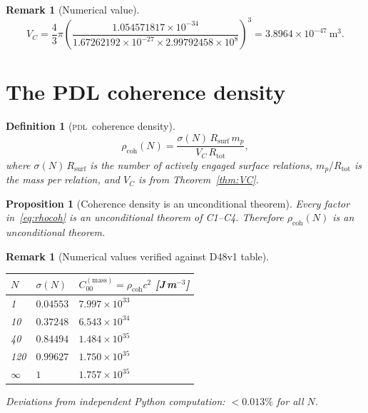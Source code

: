 \documentclass[12pt,a4paper]{article}
\newtheorem{proposition}[theorem]{Proposition}
\newtheorem{definition}[theorem]{Definition}
\newtheorem{remark}[theorem]{Remark}
\newcommand{\PDL}{\textsc{pdl}}
\newcommand{\Cmass}{C^{(\mathrm{mass})}}
\newcommand{\rhocoh}{\rho_{\mathrm{coh}}}
\newcommand{\sig}{\sigma}
\newcommand{\Rsurf}{R_{\mathrm{surf}}}
\newcommand{\Rtot}{R_{\mathrm{tot}}}
\newcommand{\VC}{V_C}
\begin{document}
\begin{remark}[Numerical value]
\begin{equation}
\VC = \frac{4}{3}\pi\left(\frac{1.054571817\times10^{-34}}{1.67262192\times10^{-27}\times2.99792458\times10^8}\right)^3 = 3.8964\times10^{-47}\ \mathrm{m}^3.
\label{eq:VC_numerical}
\end{equation}
\end{remark}

\section{The PDL coherence density}
\label{sec:rho}

\begin{definition}[\PDL\ coherence density]
\label{def:rhocoh}
\begin{equation}
\rhocoh(N) = \frac{\sig(N)\,\Rsurf\,m_p}{\VC\,\Rtot},
\label{eq:rhocoh}
\end{equation}
where $\sig(N)\,\Rsurf$ is the number of actively engaged surface relations, $m_p/\Rtot$ is the mass per relation, and $\VC$ is from Theorem~\ref{thm:VC}.
\end{definition}

\begin{proposition}[Coherence density is an unconditional theorem]
\label{prop:rhocoh}
Every factor in~\eqref{eq:rhocoh} is an unconditional theorem of C1--C4. Therefore $\rhocoh(N)$ is an unconditional theorem.
\end{proposition}

\begin{remark}[Numerical values verified against D48v1 table]
\label{rem:rhocoh_num}
\begin{center}
\begin{tabular}{p{1.2cm}p{3.5cm}p{4.5cm}}
\toprule
$N$ & $\sig(N)$ & $\Cmass_{00} = \rhocoh c^2$ [J\,m$^{-3}$] \\
\midrule
1 & $0.04553$ & $7.997\times10^{33}$ \\
10 & $0.37248$ & $6.543\times10^{34}$ \\
40 & $0.84494$ & $1.484\times10^{35}$ \\
120 & $0.99627$ & $1.750\times10^{35}$ \\
$\infty$ & $1$ & $1.757\times10^{35}$ \\
\bottomrule
\end{tabular}
\end{center}
Deviations from independent Python computation: $<0.013\%$ for all $N$.
\end{remark}
\end{document}
